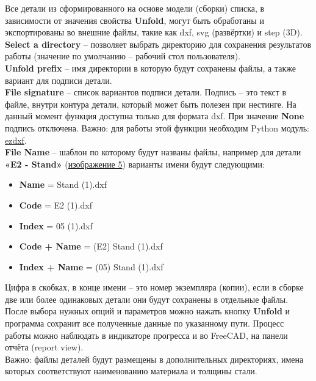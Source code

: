 \documentclass[a4paper,12pt]{article}
\begin{document}
Все детали из сформированного на основе модели (сборки) списка, в зависимости от значения свойства \textbf{Unfold}, могут быть обработаны и экспортированы во внешние файлы, такие как dxf, svg (развёртки) и step (3D).\\

\textbf{Select a directory} -- позволяет выбрать директорию для сохранения результатов работы (значение по умолчанию -- рабочий стол пользователя).\\

\textbf{Unfold prefix} -- имя директории в которую будут сохранены файлы, а также вариант для подписи детали.\\

\textbf{File signature} -- список вариантов подписи детали. Подпись -- это текст в файле, внутри контура детали, который может быть полезен при нестинге. На данный момент функция доступна только для формата dxf. При значение \textbf{None} подпись отключена. Важно: для работы этой функции необходим Python модуль: \href{https://pypi.org/project/ezdxf/}{ezdxf}.\\

\textbf{File Name} -- шаблон по которому будут названы файлы, например для детали \textbf{«E2 - Stand»} (\hyperref[sec:properties]{изображение 5}) варианты имени будут следующими:
\begin{itemize}
	\item \textbf{Name} = Stand (1).dxf
	\item \textbf{Code} = E2 (1).dxf
	\item \textbf{Index} = 05 (1).dxf
	\item \textbf{Code + Name} = (E2) Stand (1).dxf
	\item \textbf{Index + Name} = (05) Stand (1).dxf
\end{itemize}

Цифра в скобках, в конце имени -- это номер экземпляра (копии), если в сборке две или более одинаковых детали они будут сохранены в отдельные файлы.\\

После выбора нужных опций и параметров можно нажать кнопку \textbf{Unfold} и программа сохранит все полученные данные по указанному пути. Процесс работы можно наблюдать в индикаторе прогресса и во FreeCAD, на панели отчёта (report view).\\

Важно: файлы деталей будут размещены в дополнительных директориях, имена которых соответствуют наименованию материала и толщины стали.
\end{document}
